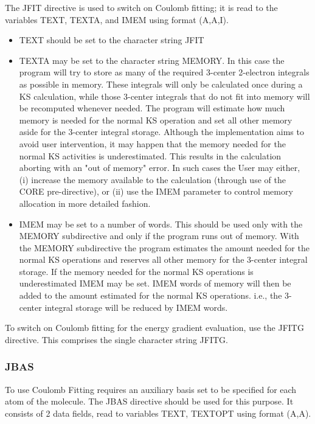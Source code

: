 \documentclass[11pt,fleqn]{article}
\begin{document}
The JFIT directive is used to switch on Coulomb fitting; it
is read to the variables TEXT, TEXTA, and IMEM using format (A,A,I).
\begin{itemize}
\item TEXT should be set to the character string JFIT
\item TEXTA may be set to the character string MEMORY. In this case the program
      will try to store as many of the required 3-center 2-electron integrals
      as possible in memory. These integrals will only be calculated once
      during a KS calculation, while those 3-center integrals that do not fit into 
      memory will be recomputed whenever needed.
      The program will estimate how much memory is needed
      for the normal KS operation and set all other memory aside for the 
      3-center integral storage. Although the implementation aims to avoid
      user intervention, it may happen that the memory needed for the normal KS
      activities is underestimated. This results in the calculation aborting
      with an "out of memory" error. In such cases the User may either, (i)
      increase the memory available to the calculation (through use of the
      CORE pre-directive), or (ii) use the IMEM parameter to control memory
      allocation in more detailed fashion.
\item IMEM may be set to a number of words. This should be used only with the
      MEMORY subdirective and only if the program runs out of memory. With the
      MEMORY subdirective the program estimates the amount needed for the normal
      KS operations and reserves all other memory for the 3-center integral 
      storage. If the memory needed for the normal KS operations is
      underestimated IMEM may be set. IMEM words of memory will then
      be added to the amount estimated for the normal KS operations. i.e., the
      3-center integral storage will be reduced by IMEM words.
\end{itemize}

To switch on Coulomb fitting for the energy gradient evaluation, use the 
JFITG directive. This comprises the single character string JFITG.

\subsubsection[JBAS]{JBAS}
To use Coulomb Fitting requires an auxiliary basis set to be specified
for each atom of the molecule. The JBAS directive should be used for
this purpose.  It consists of 2 data fields, read to variables TEXT,
TEXTOPT using format (A,A).
\end{document}

